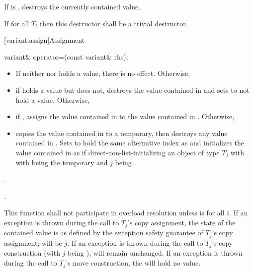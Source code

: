 \begin{itemdescr}
\pnum
\effects
If  is ,
destroys the currently contained value.

\pnum
\remarks
If  for all $T_i$
then this destructor shall be a trivial destructor.
\end{itemdescr}

[variant.assign]{Assignment}

%
\begin{itemdecl}
variant& operator=(const variant& rhs);
\end{itemdecl}

\begin{itemdescr}
\pnum
\effects
\begin{itemize}
\item
If neither  nor  holds a value, there is no effect.  Otherwise,
\item
if  holds a value but  does not, destroys the value
contained in  and sets  to not hold a value.  Otherwise,
\item
if , assigns the value contained in 
to the value contained in . Otherwise,
\item
copies the value contained in  to a temporary, then destroys any
value contained in . Sets  to hold the same
alternative index as  and initializes the value contained in
 as if direct-non-list-initializing an object of type $T_j$
with  with  being the temporary and
$j$ being .
\end{itemize}

\pnum
\returns {}.

\pnum
\postconditions {}.

\pnum
\remarks
This function shall not participate in overload resolution unless
is  for all $i$.
If an exception is thrown during the call to $T_j$'s copy assignment,
the state of the contained value is as defined by the exception safety
guarantee of $T_j$'s copy assignment;  will be $j$.
If an exception is thrown during the call to $T_j$'s copy construction
(with $j$ being ),  will remain unchanged.
If an exception is thrown during the call to $T_j$'s move construction,
the  will hold no value.
\end{itemdescr}

